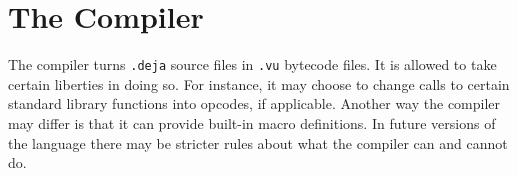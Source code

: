 \chapter{The Compiler}

The compiler turns \verb!.deja! source files in \verb!.vu! bytecode files. It
is allowed to take certain liberties in doing so. For instance, it may choose
to change calls to certain standard library functions into opcodes, if
applicable. Another way the compiler may differ is that it can provide built-in
macro definitions. In future versions of the language there may be stricter
rules about what the compiler can and cannot do. 
